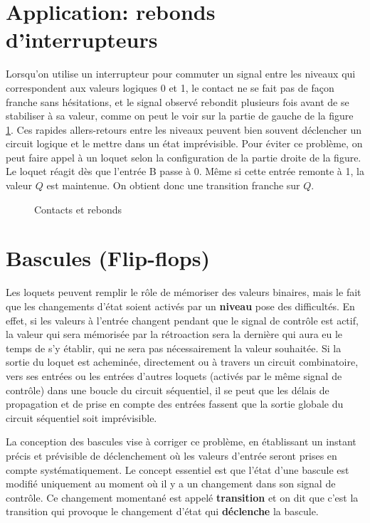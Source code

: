 \documentclass[letter, oneside]{book}
\begin{document}
\section{Application: rebonds d'interrupteurs}
\label{sec:org1c9b0ae}

Lorsqu'on utilise un interrupteur pour commuter un signal entre les
niveaux qui correspondent aux valeurs logiques 0 et 1, le contact ne
se fait pas de façon franche sans hésitations, et le signal observé
rebondit plusieurs fois avant de se stabiliser à sa valeur, comme on
peut le voir sur la partie de gauche de la figure \ref{fig:org3b29660}. Ces
rapides allers-retours entre les niveaux peuvent bien souvent
déclencher un circuit logique et le mettre dans un état
imprévisible. Pour éviter ce problème, on peut faire appel à un loquet
selon la configuration de la partie droite de la figure. Le loquet
réagit dès que l'entrée B passe à 0. Même si cette entrée remonte à 1,
la valeur \(Q\) est maintenue. On obtient donc une transition franche sur
\(Q\).

\begin{figure}[htbp]
\centering

\caption{\label{fig:org3b29660}Contacts et rebonds}
\end{figure}

\section{Bascules (Flip-flops)}
\label{sec:org072a76a}

Les loquets peuvent remplir le rôle de mémoriser des valeurs binaires,
mais le fait que les changements d'état soient activés par un \textbf{niveau}
pose des difficultés. En effet, si les valeurs à l'entrée changent
pendant que le signal de contrôle est actif, la valeur qui sera
mémorisée par la rétroaction sera la dernière qui aura eu le temps de
s'y établir, qui ne sera pas nécessairement la valeur souhaitée. Si la
sortie du loquet est acheminée, directement ou à travers un circuit
combinatoire, vers ses entrées ou les entrées d'autres loquets
(activés par le même signal de contrôle) dans une boucle du circuit
séquentiel, il se peut que les délais de propagation et de prise en
compte des entrées fassent que la sortie globale du circuit séquentiel
soit imprévisible.

La conception des bascules vise à corriger ce problème, en établissant
un instant précis et prévisible de déclenchement où les valeurs
d'entrée seront prises en compte systématiquement. Le concept
essentiel est que l'état d'une bascule est modifié uniquement au
moment où il y a un changement dans son signal de contrôle. Ce
changement momentané est appelé \textbf{transition} et on dit que c'est la
transition qui provoque le changement d'état qui \textbf{déclenche} la
bascule.
\end{document}
